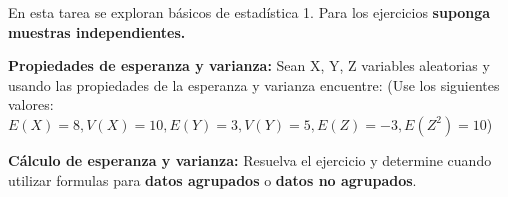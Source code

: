 \documentclass{oxmathproblems}
\begin{document}
En esta tarea se exploran básicos de estadística 1. Para los ejercicios \textbf{suponga muestras independientes.}

\begin{questions}

\miquestion \textbf{Propiedades de esperanza y varianza:}
Sean X, Y, Z variables aleatorias y usando las propiedades de la esperanza y varianza encuentre: (Use los siguientes valores: $E(X) = 8, V(X) = 10, E(Y) = 3, V(Y) = 5, E(Z) = -3, E(Z^2) = 10$)  

\miquestion \textbf{Cálculo de esperanza y varianza:}
Resuelva el ejercicio y determine cuando utilizar formulas para \textbf{datos agrupados} o \textbf{datos no agrupados}. 

\begin{parts}


\end{parts}
\end{questions}
\end{document}
